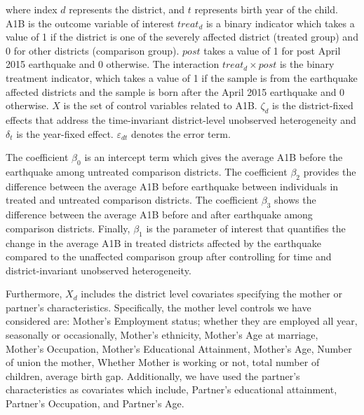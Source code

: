 \documentclass[11pt,a4paper]{article}
\begin{document}
\noindent where index $d$ represents the district, and $t$ represents birth year of the child. A1B is the outcome variable of interest $treat_{d}$ is a binary indicator which takes a value of 1 if the district is one of the severely affected district (treated group) and 0 for other districts (comparison group). $post$ takes a value of 1 for post April 2015 earthquake and 0 otherwise. The interaction $treat_{d} \times post$ is the binary treatment indicator, which takes a value of 1 if the sample is from the earthquake affected districts and the sample is born after the April 2015 earthquake and 0 otherwise. $X$ is the set of control variables related to A1B. $\zeta_{d}$ is the district-fixed effects that address the time-invariant district-level unobserved heterogeneity and $\delta_{t}$ is the year-fixed effect. $\varepsilon_{dt}$ denotes the error term. 

\vspace{0.25 cm}

The coefficient $\beta_{0}$ is an intercept term which gives the average A1B before the earthquake among untreated comparison districts. The coefficient $\beta_{2}$ provides the difference between the average A1B before earthquake between individuals in treated and untreated comparison districts. The coefficient $\beta_{3}$ shows the difference between the average A1B before and after earthquake among comparison districts. Finally, $\beta_{1}$ is the parameter of interest that quantifies the change in the average A1B in treated districts affected by the earthquake compared to the unaffected comparison group after controlling for time and district-invariant unobserved heterogeneity.

\vspace{0.25 cm}

Furthermore, $X_d$ includes the district level covariates specifying the mother or partner's characteristics. Specifically, the mother level controls we have considered are: Mother's Employment status; whether they are employed all year, seasonally or occasionally, Mother's ethnicity, Mother's Age at marriage, Mother's Occupation, Mother's Educational Attainment, Mother's Age, Number of union the mother, Whether Mother is working or not, total number of children, average birth gap. Additionally, we have used the partner's characteristics as covariates which include, Partner's educational attainment, Partner's Occupation, and Partner's Age. 

\vspace{0.25 cm}
\end{document}
